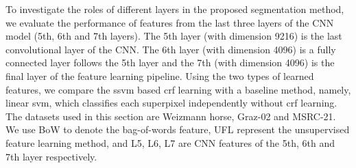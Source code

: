 \documentclass[10pt,3p]{elsarticle}
\newcommand{\ssvm}{{\sc ssvm}\xspace}
\newcommand{\svm}{{\sc svm}\xspace}
\newcommand{\crf}{{\sc crf}\xspace}
\begin{document}
To investigate the roles of different layers in the proposed segmentation method, we evaluate the performance of features from the last three layers of the CNN model (5th, 6th and 7th layers). The 5th layer (with dimension 9216) is the last convolutional layer of the CNN. 
The 6th layer (with dimension 4096) is a fully connected layer follows the 5th layer and the 7th (with dimension 4096) is the final layer of the feature learning pipeline.
Using the two types of learned features, we compare the \ssvm based \crf learning with a baseline method, namely, linear \svm, which classifies each superpixel independently without \crf learning.
The datasets used in this section are Weizmann horse, Graz-02 and MSRC-21.
We use BoW to denote the bag-of-words feature, UFL represent the unsupervised feature learning method, and L5, L6, L7 are CNN features of the 5th, 6th and 7th layer respectively.
\end{document}
